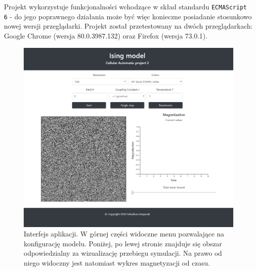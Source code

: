 \documentclass[11pt] {article}
\begin{document}
\vspace{1.0em}

Projekt wykorzystuje funkcjonalności wchodzące w skład standardu \lstinline{ECMAScript 6} - do jego poprawnego działania może być więc konieczne posiadanie stosunkowo nowej wersji przeglądarki. Projekt został przetestowany na dwóch przeglądarkach: Google Chrome (wersja 80.0.3987.132) oraz Firefox (wersja 73.0.1).


\begin{figure}[H]
\centering
\includegraphics[width=\textwidth]{res/interface.png}
\caption{Interfejs aplikacji. W górnej części widoczne menu pozwalające na konfigurację modelu. Poniżej, po lewej stronie znajduje się obszar odpowiedzialny za wizualizację przebiegu symulacji. Na prawo od niego widoczny jest natomiast wykres magnetyzacji od czasu.}
\label{fig:interface}
\end{figure}
\end{document}
